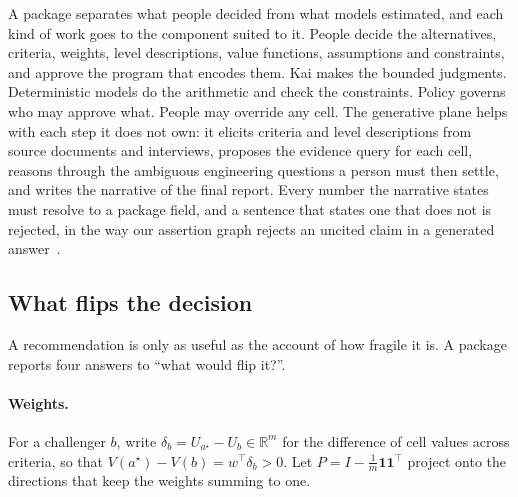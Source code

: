 A package separates what people decided from what models estimated, and
each kind of work goes to the component suited to it. People decide the
alternatives, criteria, weights, level descriptions, value functions,
assumptions and constraints, and approve the program that encodes them. Kai
makes the bounded judgments. Deterministic models do the arithmetic and check
the constraints. Policy governs who may approve what. People may override any
cell. The generative plane helps with each step it does not own: it elicits
criteria and level descriptions from source documents and interviews, proposes
the evidence query for each cell, reasons through the ambiguous engineering
questions a person must then settle, and writes the narrative of the final
report. Every number the narrative states must resolve to a package
field, and a sentence that states one that does not is rejected, in the way
our assertion graph rejects an uncited claim in a generated
answer~\cite{hanzographpaper}.

\subsection{What flips the decision}
\label{sec:flip}

A recommendation is only as useful as the account of how fragile it is. A
package reports four answers to ``what would flip it?''.

\paragraph{Weights.}
For a challenger $b$, write $\delta_b = U_{a^\star} - U_b \in \mathbb{R}^m$ for
the difference of cell values across criteria, so that
$V(a^\star) - V(b) = w^{\top}\delta_b > 0$. Let
$P = I - \tfrac{1}{m}\mathbf{1}\mathbf{1}^{\top}$ project onto the directions
that keep the weights summing to one.

